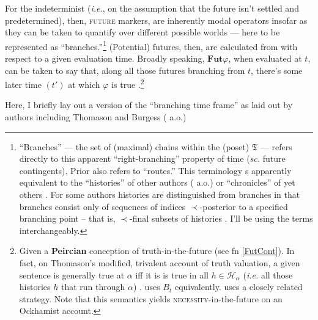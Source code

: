 \documentclass[12pt,dvipsnames]{report}
\begin{document}
For the indeterminist (\textit{i.e.}, on the assumption that the future isn't settled and predetermined), then, \textsc{future} markers, are inherently modal operators insofar as they can be taken to quantify over different possible worlds --- here to be represented as ``branches.''\footnote{``Branches'' --- the set of (maximal) chains within the (poset) $\mathfrak T$ --- refers directly to this apparent ``right-branching'' property of time (\textit{sc.} future contingents). Prior also refers to ``routes.'' This terminology s apparently equivalent to the ``histories'' of other authors (\citealp{Thomason1970,Dowty1977,Tedeschi1981,Belnap2001a} a.o.) or ``chronicles'' of yet others \citep{Øhrstrøm1995}. For some authors histories are distinguished from branches in that branches consist only of sequences of indices $ \prec $-posterior to a specified branching point -- that is, $ \prec $-final subsets of histories \citep[\textit{e.g.},][4]{Zanardo1996}. I'll be using the terms interchangeably.} (Potential) futures, then, are calculated from with respect to a given evaluation time. Broadly speaking, $ \mathbf{Fut} \varphi $, when evaluated at $ t $, can be taken to say that, along all those futures branching from $ t $, there's some later time $ (t') $ at which $ \varphi $ is true \citep[see][267]{Thomason1970}.\footnote{Given a \textbf{Peircian} conception of truth-in-the-future (see fn \ref{FutCont}). In fact, on Thomason's modified, trivalent account of truth valuation, a given sentence is generally true at $ \alpha $ iff it is is true in all $ h\in\mathcal H_\alpha $ (\textit{i.e.} all those histories $ h $ that run through $ \alpha $) \citeyearpar[274\textit{ff}]{Thomason1970}. \citet{Thomason1984} uses $\mathit B_t $ equivalently. \citet[247]{Tedeschi1981} uses a closely related strategy. Note that this semantics yields \textsc{necessity}-in-the-future on an Ockhamist account.} 

Here, I briefly lay out a version of the ``branching time frame'' as laid out by authors including Thomason \citeyearpar[\textit{e.g.},][\S 5]{Thomason1984} and Burgess (\citeyear[\textit{e.g.},][]{Burgess1978} a.o.) 


\end{document}
